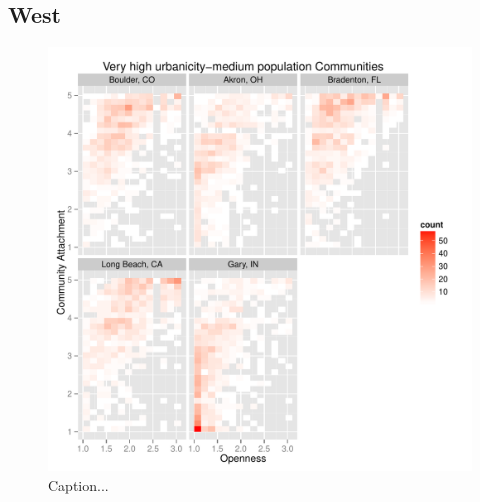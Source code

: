 \documentclass[11pt]{article}\usepackage{knitr}
\begin{document}
\subsection*{West}
\begin{knitrout}
\color{fgcolor}\begin{figure}[H]

\includegraphics[width=\maxwidth]{figure/west_one} \caption[Caption]{Caption...\label{fig:west_one}}
\end{figure}


\end{knitrout}
\end{document}
